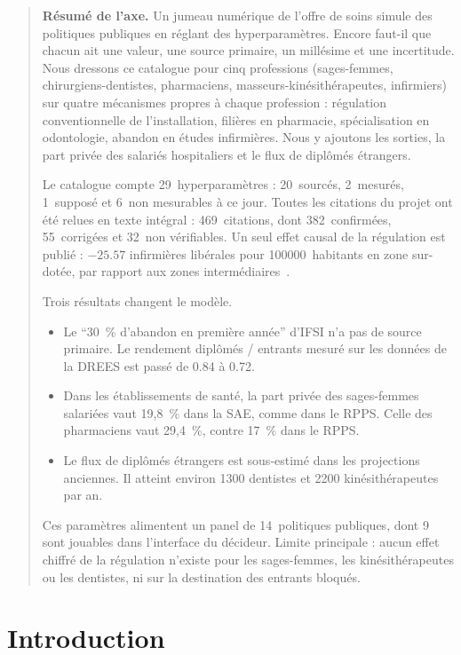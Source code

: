 \begin{quote}\small\textbf{Résumé de l'axe.} Un jumeau numérique de l'offre de soins simule des politiques publiques en
réglant des hyperparamètres. Encore faut-il que chacun ait une valeur, une
source primaire, un millésime et une incertitude. Nous dressons ce catalogue
pour cinq professions (sages-femmes, chirurgiens-dentistes, pharmaciens,
masseurs-kinésithérapeutes, infirmiers) sur quatre mécanismes propres à chaque
profession : régulation conventionnelle de l'installation, filières en
pharmacie, spécialisation en odontologie, abandon en études infirmières.
Nous y ajoutons les sorties, la part privée des salariés hospitaliers et le
flux de diplômés étrangers.

Le catalogue compte 29~hyperparamètres : 20~sourcés, 2~mesurés, 1~supposé et
6~non mesurables à ce jour. Toutes les citations du projet ont été relues en
texte intégral : 469~citations, dont 382~confirmées, 55~corrigées et
32~non vérifiables. Un seul effet causal de la régulation est publié :
$\num{-25.57}$ infirmières libérales pour \num{100000}~habitants en zone
sur-dotée, par rapport aux zones intermédiaires~\cite{a1-irdes270}.

Trois résultats changent le modèle.
\begin{itemize}
\item Le \enquote{30~\% d'abandon en première année} d'IFSI n'a pas de
  source primaire. Le rendement diplômés / entrants mesuré sur les données
  de la DREES est passé de \num{0.84}\mesure{} à \num{0.72}\mesure.
\item Dans les établissements de santé, la part privée des sages-femmes
  salariées vaut 19,8~\%\mesure{} dans la SAE, comme dans le RPPS. Celle
  des pharmaciens vaut 29,4~\%\mesure{}, contre 17~\% dans le RPPS.
\item Le flux de diplômés étrangers est sous-estimé dans les projections
  anciennes. Il atteint environ \num{1300} dentistes et \num{2200}
  kinésithérapeutes par an.
\end{itemize}

Ces paramètres alimentent un panel de 14~politiques publiques, dont 9 sont
jouables dans l'interface du décideur. Limite principale : aucun effet
chiffré de la régulation n'existe pour les sages-femmes, les
kinésithérapeutes ou les dentistes, ni sur la destination des entrants
bloqués.\end{quote}

\section{Introduction}

